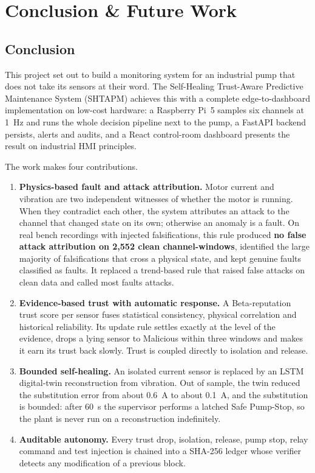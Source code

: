 \chapter{Conclusion \& Future Work}
\label{ch:conclusion}

\section{Conclusion}

This project set out to build a monitoring system for an industrial pump that does not take its sensors at their word. The Self-Healing Trust-Aware Predictive Maintenance System (SHTAPM) achieves this with a complete edge-to-dashboard implementation on low-cost hardware: a Raspberry Pi~5 samples six channels at 1~Hz and runs the whole decision pipeline next to the pump, a FastAPI backend persists, alerts and audits, and a React control-room dashboard presents the result on industrial HMI principles.

The work makes four contributions.

\begin{enumerate}
  \item \textbf{Physics-based fault and attack attribution.} Motor current and vibration are two independent witnesses of whether the motor is running. When they contradict each other, the system attributes an attack to the channel that changed state on its own; otherwise an anomaly is a fault. On real bench recordings with injected falsifications, this rule produced \textbf{no false attack attribution on 2,552 clean channel-windows}, identified the large majority of falsifications that cross a physical state, and kept genuine faults classified as faults. It replaced a trend-based rule that raised false attacks on clean data and called most faults attacks.
  \item \textbf{Evidence-based trust with automatic response.} A Beta-reputation trust score per sensor fuses statistical consistency, physical correlation and historical reliability. Its update rule settles exactly at the level of the evidence, drops a lying sensor to Malicious within three windows and makes it earn its trust back slowly. Trust is coupled directly to isolation and release.
  \item \textbf{Bounded self-healing.} An isolated current sensor is replaced by an LSTM digital-twin reconstruction from vibration. Out of sample, the twin reduced the substitution error from about 0.6~A to about 0.1~A, and the substitution is bounded: after 60~s the supervisor performs a latched Safe Pump-Stop, so the plant is never run on a reconstruction indefinitely.
  \item \textbf{Auditable autonomy.} Every trust drop, isolation, release, pump stop, relay command and test injection is chained into a SHA-256 ledger whose verifier detects any modification of a previous block.
\end{enumerate}

